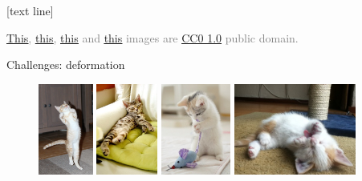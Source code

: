 \documentclass[dvipsnames]{beamer}
\newcommand{\referencefootnote}[1]{\setbeamertemplate{footline}[text line]{%
\parbox{0.9\paperwidth}{\vspace*{-23pt}\tiny{\textcolor{gray}{#1}}\hfill\scriptsize\insertframenumber}}}
\begin{document}
{ \referencefootnote{\href{https://www.flickr.com/photos/andymiccone/29212712404/}{\underline{This}}, \href{https://www.flickr.com/photos/imoviesh/29065050008/}{\underline{this}}, \href{https://www.flickr.com/photos/imoviesh/40034063605/}{\underline{this}} and \href{https://www.flickr.com/photos/imoviesh/28877326228/}{\underline{this}} images are \href{https://creativecommons.org/publicdomain/zero/1.0/deed.en}{\underline{CC0 1.0}} public domain.}
\begin{frame}{Challenges: deformation}
\begin{figure}
\includegraphics[height =3cm]{figures/def1.jpg}
\includegraphics[height =3cm]{figures/def2.jpg}
\includegraphics[height =3cm]{figures/def3.jpg}
\includegraphics[height =3cm]{figures/def4.jpg}
\end{figure}
\end{frame}
}
\end{document}
